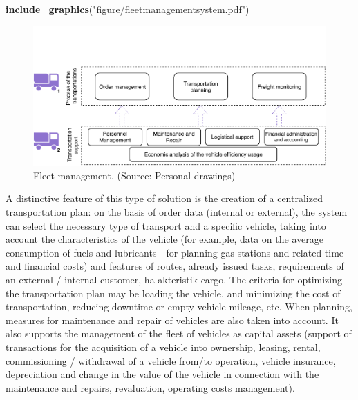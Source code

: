 \documentclass[12pt,twoside]{reedthesis}
\newenvironment{Shaded}{\begin{snugshade}}{\end{snugshade}}
\newcommand{\KeywordTok}[1]{\textcolor[rgb]{0.13,0.29,0.53}{\textbf{#1}}}
\newcommand{\NormalTok}[1]{#1}
\newcommand{\StringTok}[1]{\textcolor[rgb]{0.31,0.60,0.02}{#1}}
\begin{document}
\begin{Shaded}
\begin{Highlighting}[]
\KeywordTok{include_graphics}\NormalTok{(}\StringTok{"figure/fleetmanagementsystem.pdf"}\NormalTok{)}
\end{Highlighting}
\end{Shaded}
\begin{figure}[h]

{\centering \includegraphics[width=0.9\linewidth,]{figure/fleetmanagementsystem} 

}

\caption{Fleet management. (Source: Personal drawings)}\label{fig:fleetmanagementsystem}
\end{figure}
A distinctive feature of this type of solution is the creation of a centralized transportation plan: on the basis of order data (internal or external), the system can select the necessary type of transport and a specific vehicle, taking into account the characteristics of the vehicle (for example, data on the average consumption of fuels and lubricants - for planning gas stations and related time and financial costs) and features of routes, already issued tasks, requirements of an external / internal customer, ha akteristik cargo. The criteria for optimizing the transportation plan may be loading the vehicle, and minimizing the cost of transportation, reducing downtime or empty vehicle mileage, etc. When planning, measures for maintenance and repair of vehicles are also taken into account. It also supports the management of the fleet of vehicles as capital assets (support of transactions for the acquisition of a vehicle into ownership, leasing, rental, commissioning / withdrawal of a vehicle from/to operation, vehicle insurance, depreciation and change in the value of the vehicle in connection with the maintenance and repairs, revaluation, operating costs management).
\end{document}
